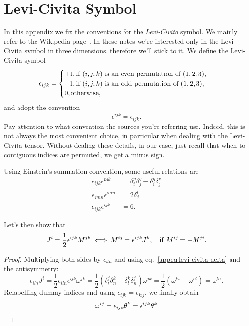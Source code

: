 \appendix
\section{Levi-Civita Symbol}\label{app:levi-civita}
In this appendix we fix the conventions for the \emph{Levi-Civita} symbol. We mainly refer to the Wikipedia page~\cite{wikipedia}. In these notes we're interested only in the Levi-Civita symbol in three dimensions, therefore we'll stick to it. We define the Levi-Civita symbol
\begin{equation}
    \epsilon_{ijk} = 
    \begin{cases}
        +1, \textup{if $(i,j,k)$ is an even permutation of $(1,2,3)$}, \\
        -1, \textup{if $(i,j,k)$ is an odd permutation of $(1,2,3)$},\\
        0, \textup{otherwise} ,
    \end{cases}
\end{equation}
and adopt the convention
\begin{equation*}
    \epsilon^{ijk} = \epsilon_{ijk}.
\end{equation*}
Pay attention to what convention the sources you're referring use. Indeed, this is not always the most convenient choice, in particular when dealing with the Levi-Civita tensor. Without dealing these details, in our case, just recall that when to contiguous indices are permuted, we get a minus sign.

Using Einstein's summation convention, some useful relations are
\begin{subequations}
\begin{align}
    \epsilon_{ijk} \epsilon^{pqk} &= \delta^p_i \delta^q_j - \delta^q_i \delta^p_j \label{appeq:levi-civita-delta} \\
    \epsilon_{jmn} \epsilon^{imn} &= 2 \delta^i_j \\
    \epsilon_{ijk} \epsilon^{ijk} &= 6 .
\end{align}
\end{subequations}

Let's then show that
\begin{equation*}
    J^i = \frac{1}{2} \epsilon^{ijk} M^{jk} \iff M^{ij} = \epsilon^{ijk} J^k, \quad \textup{if $M^{ij} = -M^{ji}$.}
\end{equation*}
\begin{proof}
    Multiplying both sides by $\epsilon_{iln}$ and using eq.~\eqref{appeq:levi-civita-delta} and the antisymmetry:
    \begin{equation*}
        \epsilon_{iln} J^i = \frac{1}{2} \epsilon_{iln} \epsilon^{ijk} \omega^{jk} = \frac{1}{2} ( \delta^j_l \delta^k_n - \delta^k_l \delta^j_n ) \omega^{jk} = \frac{1}{2} (\omega^{ln} - \omega^{nl}) = \omega^{ln} .
    \end{equation*}
    Relabelling dummy indices and using $\epsilon_{ijk} = \epsilon_{kij}$, we finally obtain
    \begin{equation*}
        \omega^{ij} = \epsilon_{ijk} \theta^k = \epsilon^{ijk} \theta^k \qedhere
    \end{equation*}

\end{proof}